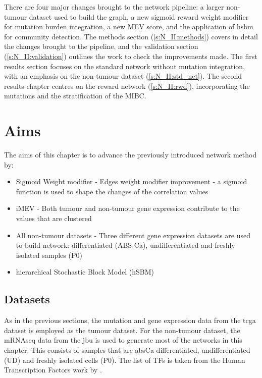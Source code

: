 There are four major changes brought to the network pipeline: a larger non-tumour dataset used to build the graph, a new sigmoid reward weight modifier for mutation burden integration, a new MEV score, and the application of \acrfull{hsbm} for community detection. The methods section (\ref{s:N_II:methods}) covers in detail the changes brought to the pipeline, and the validation section (\ref{s:N_II:validation}) outlines the work to check the improvements made. The first results section focuses on the standard network without mutation integration, with an emphasis on the non-tumour dataset (\cref{s:N_II:std_net}). The second results chapter centres on the reward network (\cref{s:N_II:rwd}), incorporating the mutations and the stratification of the MIBC.


\section{Aims}

The aims of this chapter is to advance the previously introduced network method by:
\begin{itemize}
    \item Sigmoid Weight modifier - Edges weight modifier improvement - a sigmoid function is used to shape the changes of the correlation values
    \item iMEV - Both tumour and non-tumour gene expression contribute to the values that are clustered 
    \item All non-tumour datasets - Three different gene expression datasets are used to build network: differentiated (ABS-Ca), undifferentiated and freshly isolated samples (P0)
    \item hierarchical Stochastic Block Model (hSBM)
\end{itemize}

\subsection*{Datasets}

As in the previous sections, the mutation and gene expression data from the \acrshort{tcga} dataset is employed as the tumour dataset. For the non-tumour dataset, the mRNAseq data from the \acrfull{jbu} is used to generate most of the networks in this chapter. This consists of samples that are \acrlong{absCa} differentiated, undifferentiated (UD) and freshly isolated cells (P0). The list of TFs is taken from the Human Transcription Factors work by \citet{Lambert2018-el}.



